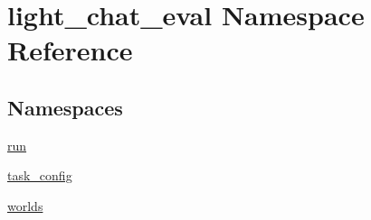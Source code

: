 \hypertarget{namespacelight__chat__eval}{}\section{light\+\_\+chat\+\_\+eval Namespace Reference}
\label{namespacelight__chat__eval}
\subsection*{Namespaces}
\begin{DoxyCompactItemize}
\item 
 \hyperlink{namespacelight__chat__eval_1_1run}{run}
\item 
 \hyperlink{namespacelight__chat__eval_1_1task__config}{task\+\_\+config}
\item 
 \hyperlink{namespacelight__chat__eval_1_1worlds}{worlds}
\end{DoxyCompactItemize}
